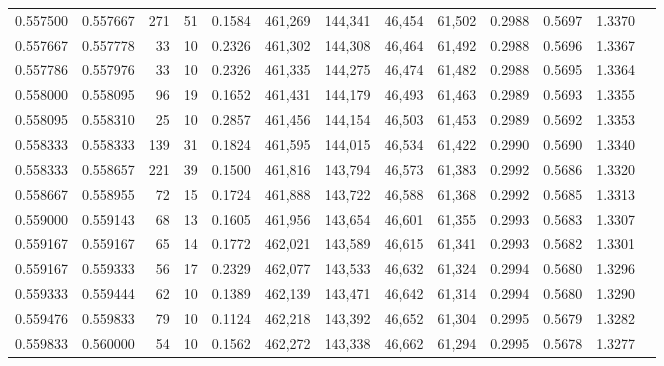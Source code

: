 \begin{tabular}{rrrrrrrrrrrrr}
0.557500 & 0.557667 &   271 &  51 &                                     0.1584 & 461,269 & 144,341 &  46,454 &  61,502 & 0.2988 & 0.5697 & 1.3370 \\
0.557667 & 0.557778 &    33 &  10 &                                     0.2326 & 461,302 & 144,308 &  46,464 &  61,492 & 0.2988 & 0.5696 & 1.3367 \\
0.557786 & 0.557976 &    33 &  10 &                                     0.2326 & 461,335 & 144,275 &  46,474 &  61,482 & 0.2988 & 0.5695 & 1.3364 \\
0.558000 & 0.558095 &    96 &  19 &                                     0.1652 & 461,431 & 144,179 &  46,493 &  61,463 & 0.2989 & 0.5693 & 1.3355 \\
0.558095 & 0.558310 &    25 &  10 &                                     0.2857 & 461,456 & 144,154 &  46,503 &  61,453 & 0.2989 & 0.5692 & 1.3353 \\
0.558333 & 0.558333 &   139 &  31 &                                     0.1824 & 461,595 & 144,015 &  46,534 &  61,422 & 0.2990 & 0.5690 & 1.3340 \\
0.558333 & 0.558657 &   221 &  39 &                                     0.1500 & 461,816 & 143,794 &  46,573 &  61,383 & 0.2992 & 0.5686 & 1.3320 \\
0.558667 & 0.558955 &    72 &  15 &                                     0.1724 & 461,888 & 143,722 &  46,588 &  61,368 & 0.2992 & 0.5685 & 1.3313 \\
0.559000 & 0.559143 &    68 &  13 &                                     0.1605 & 461,956 & 143,654 &  46,601 &  61,355 & 0.2993 & 0.5683 & 1.3307 \\
0.559167 & 0.559167 &    65 &  14 &                                     0.1772 & 462,021 & 143,589 &  46,615 &  61,341 & 0.2993 & 0.5682 & 1.3301 \\
0.559167 & 0.559333 &    56 &  17 &                                     0.2329 & 462,077 & 143,533 &  46,632 &  61,324 & 0.2994 & 0.5680 & 1.3296 \\
0.559333 & 0.559444 &    62 &  10 &                                     0.1389 & 462,139 & 143,471 &  46,642 &  61,314 & 0.2994 & 0.5680 & 1.3290 \\
0.559476 & 0.559833 &    79 &  10 &                                     0.1124 & 462,218 & 143,392 &  46,652 &  61,304 & 0.2995 & 0.5679 & 1.3282 \\
0.559833 & 0.560000 &    54 &  10 &                                     0.1562 & 462,272 & 143,338 &  46,662 &  61,294 & 0.2995 & 0.5678 & 1.3277 \\

\end{tabular}
